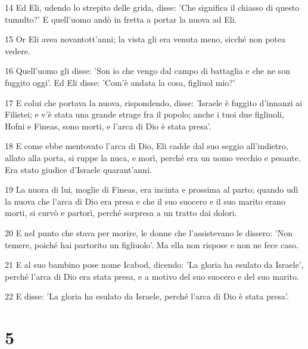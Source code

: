 \par 14 Ed Eli, udendo lo strepito delle grida, disse: 'Che significa il chiasso di questo tumulto?' E quell'uomo andò in fretta a portar la nuova ad Eli.
\par 15 Or Eli avea novantott'anni; la vista gli era venuta meno, sicché non potea vedere.
\par 16 Quell'uomo gli disse: 'Son io che vengo dal campo di battaglia e che ne son fuggito oggi'. Ed Eli disse: 'Com'è andata la cosa, figliuol mio?'
\par 17 E colui che portava la nuova, rispondendo, disse: 'Israele è fuggito d'innanzi ai Filistei; e v'è stata una grande strage fra il popolo; anche i tuoi due figliuoli, Hofni e Fineas, sono morti, e l'arca di Dio è stata presa'.
\par 18 E come ebbe mentovato l'arca di Dio, Eli cadde dal suo seggio all'indietro, allato alla porta, si ruppe la nuca, e morì, perché era un uomo vecchio e pesante. Era stato giudice d'Israele quarant'anni.
\par 19 La nuora di lui, moglie di Fineas, era incinta e prossima al parto; quando udì la nuova che l'arca di Dio era presa e che il suo suocero e il suo marito erano morti, si curvò e partorì, perché sorpresa a un tratto dai dolori.
\par 20 E nel punto che stava per morire, le donne che l'assistevano le dissero: 'Non temere, poiché hai partorito un figliuolo'. Ma ella non rispose e non ne fece caso.
\par 21 E al suo bambino pose nome Icabod, dicendo: 'La gloria ha esulato da Israele', perché l'arca di Dio era stata presa, e a motivo del suo suocero e del suo marito.
\par 22 E disse: 'La gloria ha esulato da Israele, perché l'arca di Dio è stata presa'.

\chapter{5}

